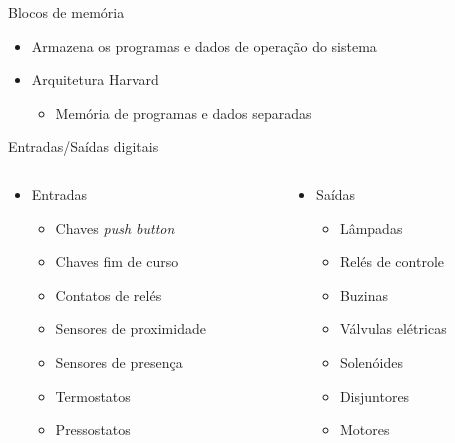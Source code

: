 \documentclass[aspectratio=169,
				xcolor=table]{beamer}
\begin{document}
	\begin{frame}{Blocos de memória}
		\begin{itemize}
			\item Armazena os programas e dados de operação do sistema
			\vspace{1em}
			\item Arquitetura Harvard
			\begin{itemize}
				\item Memória de programas e dados \alert{separadas}
			\end{itemize}
		\end{itemize}
		
	\end{frame}
	
	\begin{frame}{Entradas/Saídas digitais}
		\begin{columns}
			\begin{column}{0.5\textwidth}
				\begin{itemize}
					\item Entradas
					\begin{itemize}
						\item Chaves \textit{push button}
						\item Chaves fim de curso
						\item Contatos de relés
						\item Sensores de proximidade 
						\item Sensores de presença
						\item Termostatos
						\item Pressostatos
					\end{itemize}
					
				\end{itemize}
			\end{column}
			\begin{column}{0.5\textwidth}
				\begin{itemize}
					\item Saídas
					\begin{itemize}
						\item Lâmpadas
						\item Relés de controle
						\item Buzinas
						\item Válvulas elétricas 
						\item Solenóides
						\item Disjuntores
						\item Motores
					\end{itemize}
					
				\end{itemize}
			\end{column}
		\end{columns}
	\end{frame}
	
\end{document}
